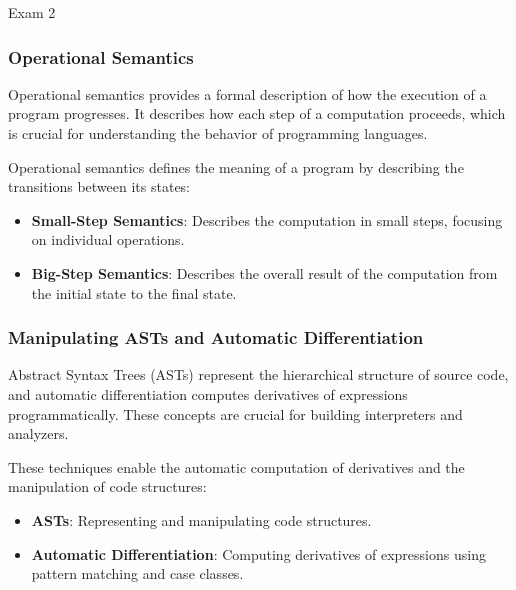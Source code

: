 \begin{examnotes}{Exam 2}
    \subsubsection*{Operational Semantics}
    
    Operational semantics provides a formal description of how the execution of a program progresses. It describes how each step of a computation proceeds, which is crucial for understanding the 
    behavior of programming languages.
    
    \begin{highlight}
        Operational semantics defines the meaning of a program by describing the transitions between its states:
        \begin{itemize}
            \item \textbf{Small-Step Semantics}: Describes the computation in small steps, focusing on individual operations.
            \item \textbf{Big-Step Semantics}: Describes the overall result of the computation from the initial state to the final state.
        \end{itemize}
    \end{highlight}
    
    \subsubsection*{Manipulating ASTs and Automatic Differentiation}
    
    Abstract Syntax Trees (ASTs) represent the hierarchical structure of source code, and automatic differentiation computes derivatives of expressions programmatically. These concepts are crucial 
    for building interpreters and analyzers.
    
    \begin{highlight}
        These techniques enable the automatic computation of derivatives and the manipulation of code structures:
        \begin{itemize}
            \item \textbf{ASTs}: Representing and manipulating code structures.
            \item \textbf{Automatic Differentiation}: Computing derivatives of expressions using pattern matching and case classes.
        \end{itemize}
    \end{highlight}
    

\end{examnotes}
